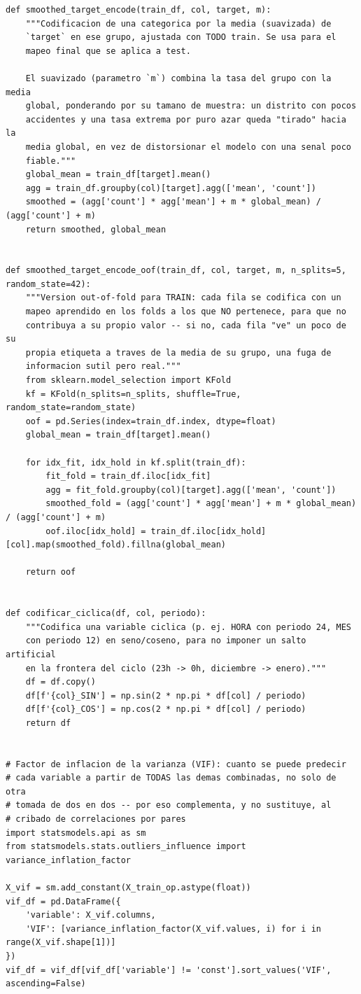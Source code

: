 \documentclass[11pt,a4paper]{article}
\begin{document}
\begin{lstlisting}[caption={Target encoding suavizado (con y sin fuga de información), codificación cíclica y VIF.}]
def smoothed_target_encode(train_df, col, target, m):
    """Codificacion de una categorica por la media (suavizada) de
    `target` en ese grupo, ajustada con TODO train. Se usa para el
    mapeo final que se aplica a test.

    El suavizado (parametro `m`) combina la tasa del grupo con la media
    global, ponderando por su tamano de muestra: un distrito con pocos
    accidentes y una tasa extrema por puro azar queda "tirado" hacia la
    media global, en vez de distorsionar el modelo con una senal poco
    fiable."""
    global_mean = train_df[target].mean()
    agg = train_df.groupby(col)[target].agg(['mean', 'count'])
    smoothed = (agg['count'] * agg['mean'] + m * global_mean) / (agg['count'] + m)
    return smoothed, global_mean


def smoothed_target_encode_oof(train_df, col, target, m, n_splits=5, random_state=42):
    """Version out-of-fold para TRAIN: cada fila se codifica con un
    mapeo aprendido en los folds a los que NO pertenece, para que no
    contribuya a su propio valor -- si no, cada fila "ve" un poco de su
    propia etiqueta a traves de la media de su grupo, una fuga de
    informacion sutil pero real."""
    from sklearn.model_selection import KFold
    kf = KFold(n_splits=n_splits, shuffle=True, random_state=random_state)
    oof = pd.Series(index=train_df.index, dtype=float)
    global_mean = train_df[target].mean()

    for idx_fit, idx_hold in kf.split(train_df):
        fit_fold = train_df.iloc[idx_fit]
        agg = fit_fold.groupby(col)[target].agg(['mean', 'count'])
        smoothed_fold = (agg['count'] * agg['mean'] + m * global_mean) / (agg['count'] + m)
        oof.iloc[idx_hold] = train_df.iloc[idx_hold][col].map(smoothed_fold).fillna(global_mean)

    return oof


def codificar_ciclica(df, col, periodo):
    """Codifica una variable ciclica (p. ej. HORA con periodo 24, MES
    con periodo 12) en seno/coseno, para no imponer un salto artificial
    en la frontera del ciclo (23h -> 0h, diciembre -> enero)."""
    df = df.copy()
    df[f'{col}_SIN'] = np.sin(2 * np.pi * df[col] / periodo)
    df[f'{col}_COS'] = np.cos(2 * np.pi * df[col] / periodo)
    return df


# Factor de inflacion de la varianza (VIF): cuanto se puede predecir
# cada variable a partir de TODAS las demas combinadas, no solo de otra
# tomada de dos en dos -- por eso complementa, y no sustituye, al
# cribado de correlaciones por pares
import statsmodels.api as sm
from statsmodels.stats.outliers_influence import variance_inflation_factor

X_vif = sm.add_constant(X_train_op.astype(float))
vif_df = pd.DataFrame({
    'variable': X_vif.columns,
    'VIF': [variance_inflation_factor(X_vif.values, i) for i in range(X_vif.shape[1])]
})
vif_df = vif_df[vif_df['variable'] != 'const'].sort_values('VIF', ascending=False)
\end{lstlisting}
\end{document}
